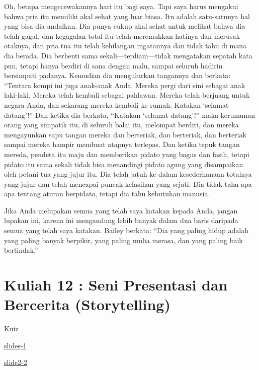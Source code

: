 \documentclass[
  letterpaper,
  DIV=11,
  numbers=noendperiod]{scrreprt}
\begin{document}
Oh, betapa mengecewakannya hari itu bagi saya. Tapi saya harus mengakui
bahwa pria itu memiliki akal sehat yang luar biasa. Itu adalah
satu-satunya hal yang bisa dia andalkan. Dia punya cukup akal sehat
untuk melihat bahwa dia telah gagal, dan kegagalan total itu telah
meremukkan hatinya dan merusak otaknya, dan pria tua itu telah
kehilangan ingatannya dan tidak tahu di mana dia berada. Dia berhenti
sama sekali---terdiam---tidak mengatakan sepatah kata pun, tetapi hanya
berdiri di sana dengan malu, sampai seluruh hadirin bersimpati padanya.
Kemudian dia mengulurkan tangannya dan berkata: ``Tentara kompi ini juga
anak-anak Anda. Mereka pergi dari sini sebagai anak laki-laki. Mereka
telah kembali sebagai pahlawan. Mereka telah berjuang untuk negara Anda,
dan sekarang mereka kembali ke rumah. Katakan `selamat datang'!'' Dan
ketika dia berkata, ``Katakan `selamat datang'!'' maka kerumunan orang
yang simpatik itu, di seluruh balai itu, melompat berdiri, dan mereka
mengayunkan sapu tangan mereka dan berteriak, dan berteriak, dan
berteriak sampai mereka hampir membuat atapnya terlepas. Dan ketika
tepuk tangan mereda, pendeta itu maju dan memberikan pidato yang bagus
dan fasih, tetapi pidato itu sama sekali tidak bisa menandingi pidato
agung yang disampaikan oleh petani tua yang jujur itu. Dia telah jatuh
ke dalam kesederhanaan totalnya yang jujur dan telah mencapai puncak
kefasihan yang sejati. Dia tidak tahu apa-apa tentang aturan berpidato,
tetapi dia tahu kebutuhan manusia.

Jika Anda melupakan semua yang telah saya katakan kepada Anda, jangan
lupakan ini, karena ini mengandung lebih banyak dalam dua baris daripada
semua yang telah saya katakan. Bailey berkata: ``Dia yang paling hidup
adalah yang paling banyak berpikir, yang paling mulia merasa, dan yang
paling baik bertindak.''


\chapter{Kuliah 12 : Seni Presentasi dan Bercerita
(Storytelling)}\label{kuliah-12-seni-presentasi-dan-bercerita-storytelling}

\href{https://forms.office.com/r/C1zb4kMcS4}{Kuiz}

\href{../bahan/K-12-Saraf_Narasi_Menggerakkan_Pengaruh_dan_Tindakan.pdf}{slides-1}

\href{../bahan/K-12-Arsitektur_Pengaruh_Masterclass_Naratif.pdf}{slide2-2}
\end{document}
